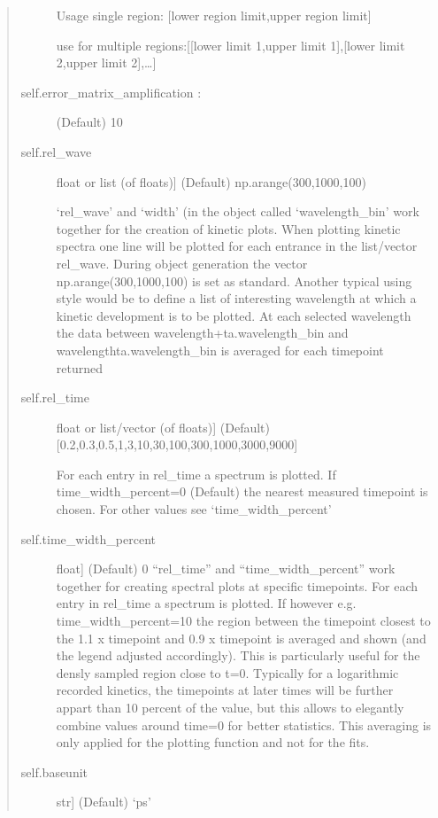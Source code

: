 \documentclass[letterpaper,10pt,english]{sphinxmanual}
\begin{document}
\begin{fulllineitems}
\begin{fulllineitems}
\begin{quote}
\begin{description}
Usage single region: {[}lower region limit,upper region limit{]}

use for multiple regions:{[}{[}lower limit 1,upper limit 1{]},{[}lower limit 2,upper limit 2{]},…{]}

\item[{self.error\_matrix\_amplification  :}] \leavevmode
(Default)  10

\item[{self.rel\_wave}] \leavevmode{[}float or list (of floats){]}
(Default)  np.arange(300,1000,100)

‘rel\_wave’ and ‘width’ (in the object called ‘wavelength\_bin’ work together for the creation
of kinetic plots. When plotting kinetic spectra one line will be plotted for each entrance
in the list/vector rel\_wave. During object generation the vector np.arange(300,1000,100)
is set as standard. Another typical using style would be to define a list of interesting
wavelength at which a kinetic development is to be plotted. At each selected wavelength
the data between wavelength+ta.wavelength\_bin and wavelength\sphinxhyphen{}ta.wavelength\_bin is averaged
for each timepoint returned

\item[{self.rel\_time}] \leavevmode{[}float or list/vector (of floats){]}
(Default)  {[}0.2,0.3,0.5,1,3,10,30,100,300,1000,3000,9000{]}

For each entry in rel\_time a spectrum is plotted. If time\_width\_percent=0 (Default) the
nearest measured timepoint is chosen. For other values see ‘time\_width\_percent’

\item[{self.time\_width\_percent}] \leavevmode{[}float{]}
(Default)  0 “rel\_time” and “time\_width\_percent” work together for
creating spectral plots at specific timepoints. For each entry
in rel\_time a spectrum is plotted. If however e.g. time\_width\_percent=10
the region between the timepoint closest to the  1.1 x timepoint
and 0.9 x timepoint is averaged and shown (and the legend adjusted accordingly).
This is particularly useful for the densly
sampled region close to t=0. Typically for a logarithmic recorded kinetics, the
timepoints at later times will be further appart than 10 percent of the value,
but this allows to elegantly combine values around time=0 for better statistics.
This averaging is only applied for the plotting function and not for the fits.

\item[{self.baseunit}] \leavevmode{[}str{]}
(Default)  ‘ps’


\end{description}
\end{quote}
\end{fulllineitems}
\end{fulllineitems}
\end{document}
